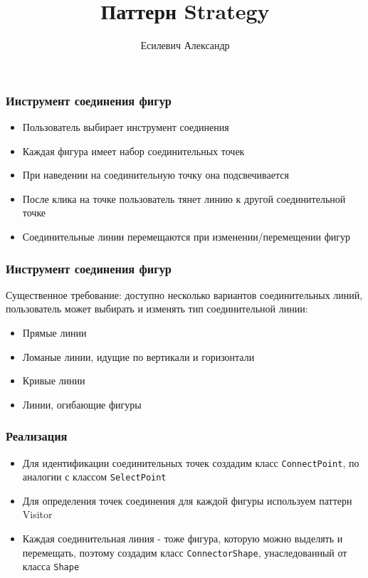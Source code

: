 \documentclass[handout]{beamer}
\title{Паттерн Strategy}
\author{Есилевич Александр}
\begin{document}
\maketitle

\begin{frame}[fragile]
\frametitle{Инструмент соединения фигур}
\begin{itemize}
\item Пользователь выбирает инструмент соединения
\item Каждая фигура имеет набор соединительных точек
\item При наведении на соединительную точку она подсвечивается
\item После клика на точке пользователь тянет линию к другой соединительной точке
\item Соединительные линии перемещаются при изменении/перемещении фигур
\end{itemize}
\end{frame}


\begin{frame}[fragile]
\frametitle{Инструмент соединения фигур}
Существенное требование: доступно несколько вариантов соединительных линий, пользователь
может выбирать и изменять тип соединительной линии:
     \begin{itemize}
     \item Прямые линии
     \item Ломаные линии, идущие по вертикали и горизонтали
     \item Кривые линии
     \item Линии, огибающие фигуры
     \end{itemize}
\end{frame}


\begin{frame}[fragile]
\frametitle{Реализация}
\begin{itemize}
\item Для идентификации соединительных точек создадим класс \lstinline{ConnectPoint},
      по аналогии с классом \lstinline{SelectPoint}
\item Для определения точек соединения для каждой фигуры используем паттерн Visitor
\item Каждая соединительная линия - тоже фигура, которую можно выделять и перемещать,
      поэтому создадим класс \lstinline{ConnectorShape}, унаследованный от класса
      \lstinline{Shape}
\end{itemize}
\end{frame}
\end{document}
